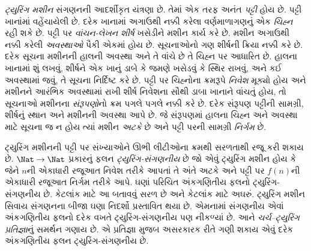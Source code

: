 \emph{ટ્યુરિંગ મશીન} સંગણનની આદર્શીકૃત યંત્રણા છે. તેમાં એક તરફ અનંત
\emph{પટ્ટી} હોય છે. પટ્ટી ખાનાંમાં વહેંચાયેલી છે. દરેક ખાનામાં અગાઉથી
નક્કી કરેલા વર્ણમાળાગણનું એક \emph{ચિહ્ન} રહી શકે છે. પટ્ટી પર
\emph{વાંચન-લેખન શીર્ષ} ખસેડીને મશીન કાર્ય કરે છે. મશીન અગાઉથી નક્કી કરેલી
\emph{અવસ્થાઓ} પૈકી એકમાં હોય છે. સૂચનાઓનો ગણ શીર્ષની ક્રિયા નક્કી કરે છે.
દરેક સૂચના મશીનની હાલની અવસ્થા અને તે વાંચે છે તે ચિહ્ન પર આધારિત છે.
હાલના ખાનામાં શું લખવું, શીર્ષને એક ખાનું ડાબે કે જમણે ખસેડવું કે સ્થિર
રાખવું, અને કઈ અવસ્થામાં જવું, તે સૂચના નિર્દિષ્ટ કરે છે. પટ્ટી પર
ચિહ્નોના ક્રમરૂપે \emph{નિવેશ} મૂક્યો હોય અને મશીનને આરંભિક અવસ્થામાં
રાખી શીર્ષ નિવેશના સૌથી ડાબા ખાનાને વાંચતું હોય, તો સૂચનાઓ મશીનના
\emph{સંરૂપણો}નો ક્રમ પગલે પગલે નક્કી કરે છે. દરેક સંરૂપણ પટ્ટીની
સામગ્રી, શીર્ષનું સ્થાન અને મશીનની અવસ્થા આપે છે. જે સંરૂપણમાં હાલના
ચિહ્ન અને અવસ્થા માટે સૂચના જ ન હોય ત્યાં મશીન \emph{અટકે} છે અને પટ્ટી
પરની સામગ્રી \emph{નિર્ગમ} છે.

ટ્યુરિંગ મશીનની પટ્ટી પર સંખ્યાઓને ઊભી લીટીઓના ક્રમથી સરળતાથી રજૂ કરી
શકાય છે. $\Nat \to \Nat$ પ્રકારનું ફલન \emph{ટ્યુરિંગ-સંગણનીય} છે
જો એવું ટ્યુરિંગ મશીન હોય કે જેને $n$ની એકાધારી રજૂઆત નિવેશ તરીકે આપતાં
તે અંતે અટકે અને પટ્ટી પર $f(n)$ની એકાધારી રજૂઆત નિર્ગમ તરીકે આપે.
ઘણાં પરિચિત અંકગણિતીય ફલનો ટ્યુરિંગ-સંગણનીય છે. કેટલાંક માટે આ
બતાવવું સરળ છે અને કેટલાંક માટે અઘરું. ટ્યુરિંગ મશીન સિવાય સંગણનના બીજા
ઘણા નિદર્શો પ્રસ્તાવિત થયા છે. એમનામાં સંગણનીય એવાં અંકગણિતીય ફલનો
દરેક વખતે ટ્યુરિંગ-સંગણનીય પણ નીકળ્યાં છે. આને \emph{ચર્ચ--ટ્યુરિંગ
પ્રતિજ્ઞા}નું સમર્થન ગણાય છે. એ પ્રતિજ્ઞા મુજબ અસરકારક રીતે ગણી શકાય
એવું દરેક અંકગણિતીય ફલન ટ્યુરિંગ-સંગણનીય છે.
